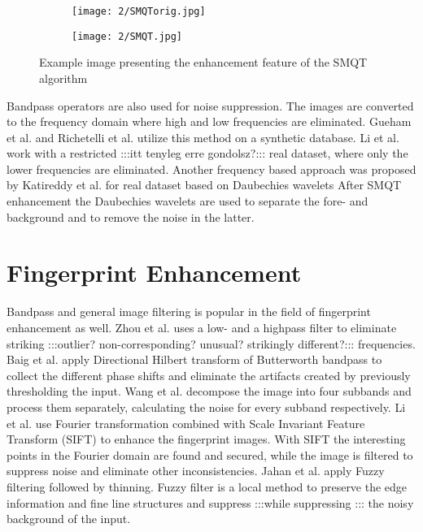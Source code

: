 \documentclass[draft,final]{vutinfth} %
\begin{document}
\begin{figure}[h]
  \centering
  \begin{subfigure}[b]{0.4\columnwidth}
    \centering
    \texttt{[image: 2/SMQTorig.jpg]}
    \label{fig:rw:SMQTin}
  \end{subfigure}
  \begin{subfigure}[b]{0.4\columnwidth}
    \centering
    \texttt{[image: 2/SMQT.jpg]}
    \label{fig:rw:SMQTout}
  \end{subfigure}
  \caption{Example image presenting the enhancement feature of the SMQT algorithm \cite{katireddy2017novel} }
  \label{fig:rw:SMQT} %
\end{figure}

\par
Bandpass operators are also used for noise suppression.
The images are converted to the frequency domain where high and low frequencies are eliminated.
Gueham et al. \cite{gueham2007automatic} and Richetelli et al. \cite{richetelli2017classification} utilize this method on a synthetic database.
Li et al. \cite{li2014retrieval} work with a restricted :::itt tenyleg erre gondolsz?::: real dataset, where only the lower frequencies are eliminated.
Another frequency based approach was proposed by Katireddy et al. \cite{katireddy2017novel} for real dataset based on Daubechies wavelets
After SMQT enhancement the Daubechies wavelets are used to separate the fore- and background and to remove the noise in the latter.

\section*{Fingerprint Enhancement}

Bandpass and general image filtering is popular in the field of fingerprint enhancement as well.
Zhou et al. \cite{zhou2011adaptive} uses a low- and a highpass filter to eliminate striking :::outlier? non-corresponding? unusual? strikingly different?::: frequencies. 
Baig et al. \cite{baig2015enhancement} apply Directional Hilbert transform of Butterworth bandpass to collect the different phase shifts and eliminate the artifacts created by previously thresholding the input.
Wang et al. \cite{wang2014enhanced} decompose the image into four subbands and process them separately, calculating the noise for every subband respectively.
Li et al. \cite{li2012texture} use Fourier transformation combined with Scale Invariant Feature Transform (SIFT) \cite{lowe1999object} to enhance the fingerprint images. 
With SIFT the interesting points in the Fourier domain are found and secured, while the image is filtered to suppress noise and eliminate other inconsistencies.
Jahan et al. \cite{jahan2017robust} apply Fuzzy filtering followed by thinning.
Fuzzy filter is a local method to preserve the edge information and fine line structures and suppress :::while suppressing ::: the noisy background of the input.
\end{document}
